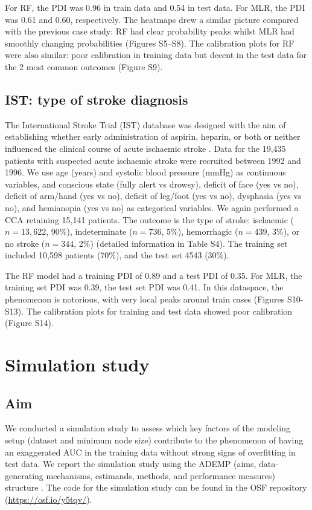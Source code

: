 For \gls{RF}, the \gls{PDI} was 0.96 in train data and 0.54 in test data. For \gls{MLR}, the \gls{PDI}
was 0.61 and 0.60, respectively. The heatmaps drew a similar picture compared
with the previous case study: \gls{RF} had clear probability peaks whilst \gls{MLR} had
smoothly changing probabilities (Figures S5--S8). The calibration plots for \gls{RF}
were also similar: poor calibration in training data but decent in the test data
for the 2 most common outcomes (Figure S9).

\subsection{IST: type of stroke diagnosis}
The International Stroke Trial (\gls{IST}) database was designed with the aim of
establishing whether early administration of aspirin, heparin, or both or
neither influenced the clinical course of acute ischaemic stroke
 \cite{sandercockInternationalStrokeTrial2011}. Data for the 19,435 patients with
suspected acute ischaemic stroke were recruited between 1992 and 1996. We use
age (years) and systolic blood pressure (mmHg) as continuous variables, and
conscious state (fully alert vs drowsy), deficit of face (yes vs no), deficit of
arm/hand (yes vs no), deficit of leg/foot (yes vs no), dysphasia (yes vs no),
and hemianopia (yes vs no) as categorical variables. We again performed a \gls{CCA}
retaining 15,141 patients. The outcome is the type of stroke: ischaemic ($n =
13{,}622$, 90\%), indeterminate ($n = 736$, 5\%), hemorrhagic ($n = 439$, 3\%),
or no stroke ($n = 344$, 2\%) (detailed information in Table S4). The training
set included 10,598 patients (70\%), and the test set 4543 (30\%).

The \gls{RF} model had a training \gls{PDI} of 0.89 and a test \gls{PDI} of 0.35. For \gls{MLR}, the
training set \gls{PDI} was 0.39, the test set \gls{PDI} was 0.41. In this dataspace, the
phenomenon is notorious, with very local peaks around train cases
(Figures S10-S13). The calibration plots for training and test data showed poor
calibration (Figure S14).

\section{Simulation study}
\label{sec:3.4}

\subsection{Aim}
We conducted a simulation study to assess which key factors of the modeling
setup (dataset and minimum node size) contribute to the phenomenon of having an
exaggerated \gls{AUC} in the training data without strong signs of overfitting in test
data. We report the simulation study using the \gls{ADEMP} (aims, data-generating
mechanisms, estimands, methods, and performance measures) structure
 \cite{morrisUsingSimulationStudies2019}. The code for the simulation study can
be found in the \gls{OSF} repository (\url{https://osf.io/y5tqv/}).

